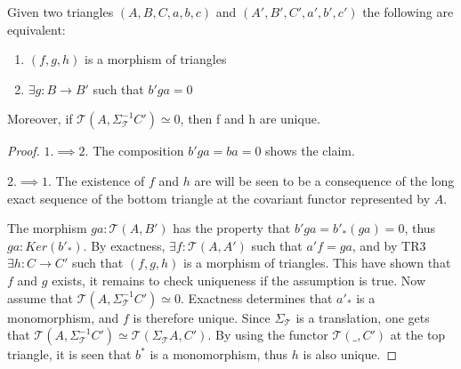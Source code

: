     \begin{lemma}
        Given two triangles $(A,B,C,a,b,c)$ and $(A',B',C',a',b',c')$ the following are equivalent:
        \begin{center}
            \begin{minipage}[c]{0.7\textwidth}
            \end{minipage}
            \begin{minipage}[c]{0.3\textwidth}
                \begin{enumerate}
                    \item $(f,g,h)$ is a morphism of triangles
                    \item $\exists g:B\rightarrow B'$ such that $b'ga = 0$
                \end{enumerate}
            \end{minipage}
        \end{center}
        Moreover, if $\mathcal{T}(A,\Sigma_{\mathcal{T}}^{-1}C')\simeq 0$, then f and h are unique.
    \end{lemma}

    \begin{proof}
        $1. \implies 2.$ The composition $b'ga = ba = 0$ shows the claim. 
        
        $2. \implies 1.$ The existence of $f$ and $h$ are will be seen to be a consequence of the long exact sequence of the bottom triangle at the covariant functor represented by $A$. 
        \begin{center}
        \end{center}
        The morphism $ga:\mathcal{T}(A,B')$ has the property that $b'ga=b'_*(ga)=0$, thus $ga:Ker(b'_*)$. By exactness, $\exists f:\mathcal{T}(A,A')$ such that $a'f = ga$, and by TR3 $\exists h: C \rightarrow C'$ such that $(f,g,h)$ is a morphism of triangles. This have shown that $f$ and $g$ exists, it remains to check uniqueness if the assumption is true.
        Now assume that $\mathcal{T}(A,\Sigma_{\mathcal{T}}^{-1}C')\simeq 0$. Exactness determines that $a'_*$ is a monomorphism, and $f$ is therefore unique. Since $\Sigma_{\mathcal{T}}$ is a translation, one gets that $\mathcal{T}(A,\Sigma_{\mathcal{T}}^{-1}C')\simeq\mathcal{T}(\Sigma_{\mathcal{T}}A,C')$. By using the functor $\mathcal{T}(\_,C')$ at the top triangle, it is seen that $b^*$ is a monomorphism, thus $h$ is also unique.
    \end{proof}

